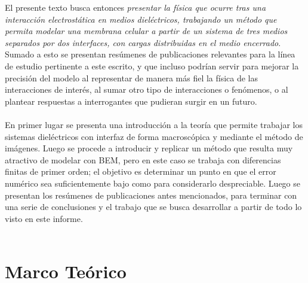 \documentclass[12pt, notitlepage]{article}
\begin{document}
El presente texto busca entonces \textit{presentar la física que ocurre tras una interacción electrostática en medios dieléctricos, trabajando un método que permita modelar una membrana celular a partir de un sistema de tres medios separados por dos interfaces, con cargas distribuidas en el medio encerrado}. Sumado a esto se presentan resúmenes de publicaciones relevantes para la línea de estudio pertinente a este escrito, y que incluso podrían servir para mejorar la precisión del modelo al representar de manera más fiel la física de las interacciones de interés, al sumar otro tipo de interacciones o fenómenos, o al plantear respuestas a interrogantes que pudieran surgir en un futuro.\\\\
En primer lugar se presenta una introducción a la teoría que permite trabajar los sistemas dieléctricos con interfaz de forma macroscópica y mediante el método de imágenes. Luego se procede a introducir y replicar un método que resulta muy atractivo de modelar con BEM, pero en este caso se trabaja con diferencias finitas de primer orden; el objetivo es determinar un punto en que el error numérico sea suficientemente bajo como para considerarlo despreciable. Luego se presentan los resúmenes de publicaciones antes mencionados, para terminar con una serie de conclusiones y el trabajo que se busca desarrollar a partir de todo lo visto en este informe.\\\\




\pagebreak
\section{Marco Teórico}
\end{document}
